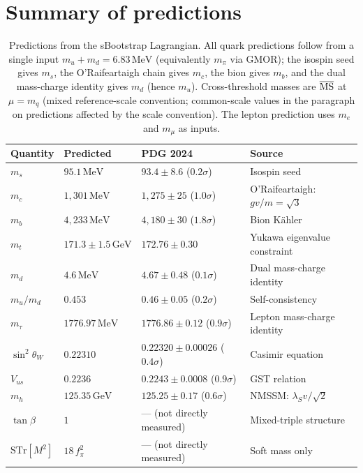 \documentclass[12pt,a4paper]{article}
\newcommand{\MeV}{\,\text{MeV}}
\newcommand{\GeV}{\,\text{GeV}}
\newcommand{\fpi}{f_\pi}
\begin{document}
\section{Summary of predictions}
\label{sec:summary_pred}

\begin{table}[ht]
\centering
\small
\begin{tabular}{llll}
\toprule
Quantity & Predicted & PDG 2024 & Source \\
\midrule
$m_s$ & $95.1\MeV$ & $93.4 \pm 8.6$ ($0.2\sigma$)
  & Isospin seed \\
$m_c$ & $1{,}301\MeV$ & $1{,}275 \pm 25$ ($1.0\sigma$)
  & O'Raifeartaigh: $gv/m = \sqrt{3}$ \\
$m_b$ & $4{,}233\MeV$ & $4{,}180 \pm 30$ ($1.8\sigma$)
  & Bion K\"ahler \\
$m_t$ & $171.3 \pm 1.5\GeV$ & $172.76 \pm 0.30$
  & Yukawa eigenvalue constraint \\
$m_d$ & $4.6\MeV$ & $4.67 \pm 0.48$ ($0.1\sigma$)
  & Dual mass-charge identity \\
$m_u/m_d$ & $0.453$ & $0.46 \pm 0.05$ ($0.2\sigma$)
  & Self-consistency \\
$m_\tau$ & $1776.97\MeV$ & $1776.86 \pm 0.12$ ($0.9\sigma$)
  & Lepton mass-charge identity \\
$\sin^2\theta_W$ & $0.22310$ & $0.22320 \pm 0.00026$ ($0.4\sigma$)
  & Casimir equation \\
$V_{us}$ & $0.2236$ & $0.2243 \pm 0.0008$ ($0.9\sigma$)
  & GST relation \\
$m_h$ & $125.35\GeV$ & $125.25 \pm 0.17$ ($0.6\sigma$)
  & NMSSM: $\lambda_S v/\sqrt{2}$ \\
$\tan\beta$ & $1$ & --- (not directly measured)
  & Mixed-triple structure \\
$\text{STr}[M^2]$ & $18\,\fpi^2$ & --- (not directly measured)
  & Soft mass only \\
\bottomrule
\end{tabular}
\caption{Predictions from the sBootstrap Lagrangian.
All quark predictions follow from a single input
$m_u + m_d = 6.83\MeV$ (equivalently $m_\pi$ via GMOR);
the isospin seed gives $m_s$, the O'Raifeartaigh chain gives $m_c$,
the bion gives $m_b$, and the dual mass-charge identity gives $m_d$ (hence $m_u$).
Cross-threshold masses are $\overline{\rm MS}$ at $\mu = m_q$
(mixed reference-scale convention; common-scale values in the
paragraph on predictions affected by the scale convention).
The lepton prediction uses $m_e$ and $m_\mu$ as inputs.}
\label{tab:predictions}
\end{table}
\end{document}
